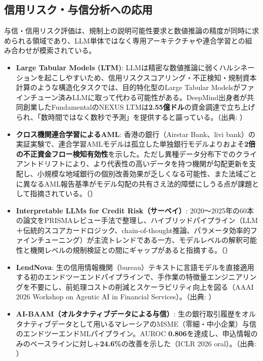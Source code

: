 \subsection{信用リスク・与信分析への応用}

与信・信用リスク評価は、規制上の説明可能性要求と数値推論の精度が同時に求められる領域であり、LLM単体ではなく専用アーキテクチャや連合学習との組み合わせが模索されている。

\begin{itemize}
  \item \textbf{Large Tabular Models (LTM)}: LLMは精密な数値推論に弱くハルシネーションを起こしやすいため、信用リスクスコアリング・不正検知・規制資本計算のような構造化タスクでは、目的特化型のLarge Tabular Modelsがファインチューン済みLLMに取って代わる可能性がある。DeepMind出身者が共同創業したFundamentalのNEXUS LTMは\textbf{2.55億ドル}の資金調達で立ち上げられ、「数時間ではなく数秒で予測」を提供すると謳っている。（出典: \cite{citiventuresndtabular}）
  \item \textbf{クロス機関連合学習によるAML}: 香港の銀行（Airstar Bank、livi bank）の実証実験で、連合学習AMLモデルは孤立した単独銀行モデルよりおよそ\textbf{2倍の不正資金フロー検知有効性}を示した。ただし異種データ分布下でのクライアントドリフトにより、より代表性の高いデータを持つ機関が勾配更新を支配し、小規模な地域銀行の個別改善効果が乏しくなる可能性、また法域ごとに異なるAML報告基準がモデル勾配の共有さえ法的障壁にしうる点が課題として指摘されている。（\cite{federatedlearning2025}）
  \item \textbf{Interpretable LLMs for Credit Risk（サーベイ）}: 2020〜2025年の60本の論文をPRISMAレビュー手法で整理し、ハイブリッドパイプライン（LLM＋伝統的スコアカードロジック、chain-of-thought推論、パラメータ効率的ファインチューニング）が主流トレンドである一方、モデルレベルの解釈可能性と機関レベルの規制検証との間にギャップがあると指摘する。（\cite{creditrisk2025}）
  \item \textbf{LendNova}: 生の信用情報機関（bureau）テキストに言語モデルを直接適用する初のエンドツーエンドパイプラインで、手作業の特徴量エンジニアリングを不要にし、前処理コストの削減とスケーラビリティ向上を図る（AAAI 2026 Workshop on Agentic AI in Financial Services）。（出典: \cite{lendnova2026}）
  \item \textbf{AI-BAAM（オルタナティブデータによる与信）}: 生の銀行取引履歴をオルタナティブデータとして用いるマレーシアのMSME（零細・中小企業）与信のエンドツーエンドMLパイプライン。AUROC \textbf{0.806}を達成し、申込情報のみのベースラインに対し\textbf{+24.6\%}の改善を示した（ICLR 2026 oral）。（出典: \cite{aibaam2025}）
\end{itemize}

